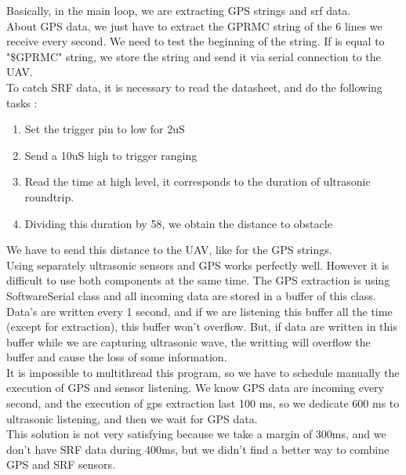 Basically, in the main loop, we are extracting GPS strings and srf data.\\

About GPS data, we just have to extract the GPRMC string of the 6 lines we receive every second.
We need to test the beginning of the string. If is equal to "\$GPRMC" string, we store the string and send it via 
serial connection to the UAV.\\

To catch SRF data, it is necessary to read the datasheet, and do the following tasks :\\

\begin{enumerate}
\item Set the trigger pin to low for 2uS
\item Send a 10uS high to trigger ranging
\item Read the time at high level, it corresponds to the duration of ultrasonic roundtrip.
\item Dividing this duration by 58, we obtain the distance to obstacle
\end{enumerate}

We have to send this distance to the UAV, like for the GPS strings.\\

Using separately ultrasonic sensors and GPS works perfectly well. However it is difficult to use both components at the same time. The GPS extraction is using SoftwareSerial class and all incoming data are stored in a buffer of this class. Data's are written every 1 second, and if we are listening this buffer all the time (except for extraction), this buffer won't overflow. But, if data are written in this buffer while we are capturing ultrasonic wave, the writting will overflow the buffer and cause the loss of some information.\\

It is impossible to multithread this program, so we have to schedule manually the execution of GPS and sensor listening. We know GPS data are incoming every second, and the execution of gps extraction last 100 ms, so we dedicate 600 ms to ultrasonic listening, and then we wait for GPS data.\\

This solution is not very satisfying because we take a margin of 300ms, and we don't have SRF data during 400ms, but we didn't find a better way to combine GPS and SRF sensors.\\



